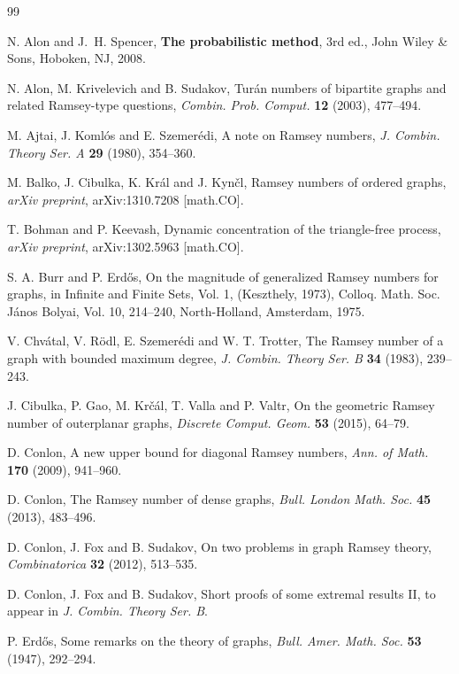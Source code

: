 \documentclass[11pt]{article}
\begin{document}
\begin{thebibliography}{99}

N. Alon and J.~H. Spencer, {\bf The probabilistic method}, 3rd ed.,
  John Wiley \& Sons, Hoboken, NJ, 2008.

N. Alon, M. Krivelevich and B. Sudakov,  Tur\'an numbers of bipartite graphs and related Ramsey-type questions, {\it Combin. Prob. Comput.} {\bf 12} (2003), 477--494.

  
{M. Ajtai, J. Koml\'os and E. Szemer\'edi,} {A note on Ramsey numbers,} {\it J. Combin. Theory Ser. A} {\bf 29} (1980), 354--360.

{M. Balko, J. Cibulka, K. Kr\'al and J. Kyn\v cl,} {Ramsey numbers of ordered graphs,} {\it arXiv preprint}, arXiv:1310.7208 [math.CO].

{T. Bohman and P. Keevash,} {Dynamic concentration of the triangle-free process,} {\it arXiv preprint}, arXiv:1302.5963 [math.CO].

{S. A. Burr and P. Erd\H{o}s,} {On the magnitude of generalized Ramsey numbers for graphs,} {in Infinite and Finite Sets, Vol. 1, (Keszthely, 1973), Colloq. Math. Soc. J\'anos Bolyai, Vol. 10,} 214--240, North-Holland, Amsterdam, 1975.

V. Chv\'atal, V. R\"odl, E. Szemer\'edi and W. T. Trotter,
The Ramsey number of a graph with bounded maximum degree, {\it J. Combin. Theory Ser. B} {\bf 34} (1983), 239--243. 

J. Cibulka, P. Gao, M. Kr\v c\'al, T. Valla and P. Valtr, On the geometric Ramsey number of outerplanar graphs, {\it Discrete Comput. Geom.} {\bf 53} (2015), 64--79.

D. Conlon, A new upper bound for diagonal Ramsey numbers, {\it Ann. of Math.} {\bf 170} (2009), 941--960.

D. Conlon, The Ramsey number of dense graphs, {\it Bull. London Math. Soc.} {\bf 45} (2013), 483--496.

D. Conlon, J. Fox and B. Sudakov, On two problems in graph Ramsey theory, {\it Combinatorica} {\bf 32} (2012), 513--535.

D. Conlon, J. Fox and B. Sudakov, Short proofs of some extremal results II, to appear in {\it J. Combin. Theory Ser. B}.

P. Erd\H{o}s, Some remarks on the theory of graphs, {\it Bull. Amer. Math. Soc.} {\bf 53} (1947), 292--294.


\end{thebibliography}
\end{document}
